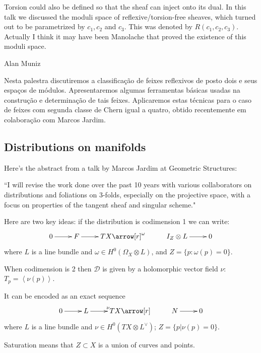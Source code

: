 \begin{remark}\leavevmode
\label{remark-reflexive-talk}
Torsion could also be defined so that the sheaf can inject onto its dual. In
this talk we discussed the moduli space of reflexive/torsion-free sheaves, which
turned out to be parametrized by $c_1, c_2$ and $c_3$. This was denoted by 
$R(c_1,c_2,c_3)$. Actually I think it may have been Manolache that proved the
existence of this moduli space.


Alan Muniz

Nesta palestra discutiremos a classificação de feixes reflexivos de posto dois e
seus espaços de módulos. Apresentaremos algumas ferramentas básicas usadas na
construção e determinação de tais feixes. Aplicaremos estas técnicas para o caso
de feixes com segunda classe de Chern igual a quatro, obtido recentemente em
colaboração com Marcos Jardim.
\end{remark}

\subsection{Distributions on manifolds}
\label{subsection-distributions-on-manifolds}

Here's the abstract from a talk by Marcos Jardim at Geometric Structures:

``I will revise the work done over the past 10 years with various collaborators
on distributions and foliations on 3-folds, especially on the projective space,
with a focus on properties of the tangent sheaf and singular scheme."

Here are two key ideas: if the distribution is codimension 1 we can write:
$$
\xymatrix{
0\ar[r]&F\ar[r]&TX\arrow[r]^{\omega}&I_Z \otimes L\ar[r]&0
}
$$
where $L$ is a line bundle and $\omega \in H^{0}(\Omega_X \otimes L)$, and
$Z=\{p:\omega(p)=0\}$.

When codimension is 2 then $\mathcal{D}$ is given by a holomorphic vector field 
$\nu$: $T_p=\left<\nu(p)\right>$.

It can be encoded as an exact sequence
$$
\xymatrix{
	0\ar[r]&L\ar[r]^{\nu}&TX\arrow[r]&N\ar[r]&0
}
$$
where $L$ is a line bundle and $\nu \in H^{0}(TX \otimes L^\vee)$;
  $Z=\{p | \nu(p) = 0\}$.

\begin{remark}
\label{remark-stauration}
Saturation means that $Z \subset X$ is a union of curves and points.
\end{remark}

